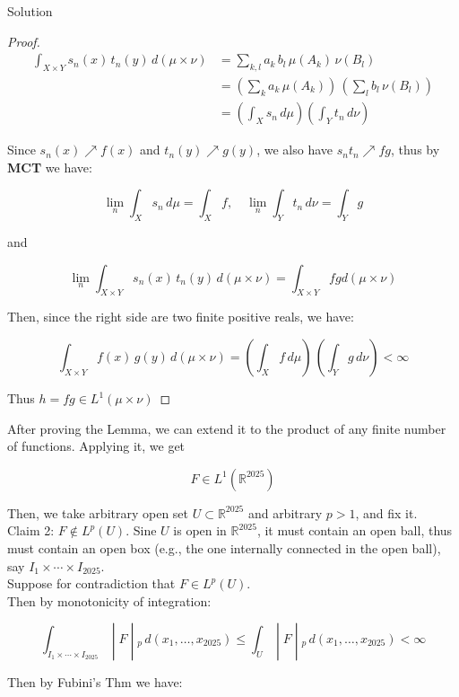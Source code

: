\documentclass{qlnotes-export}
\begin{document}
\begin{qlsolution}{Solution}
\begin{proof}
\[\begin{matrix}
{\int_{X \times Y}s_{n}(x)\, t_{n}(y)\, d(\mu \times \nu)} & {= \sum\limits_{k,l}a_{k}\, b_{l}\,\mu(A_{k})\,\nu(B_{l})} \\
 & {= (\sum\limits_{k}a_{k}\,\mu(A_{k}))\,(\sum\limits_{l}b_{l}\,\nu(B_{l}))} \\
 & {= (\int_{X}s_{n}\, d\mu)(\int_{Y}t_{n}\, d\nu)}
\end{matrix}\]

Since \(s_{n}(x)\operatorname{\nearrow ︎}f(x)\) and \(t_{n}(y)\operatorname{\nearrow ︎}g(y)\), we also have \(s_{n}t_{n}\operatorname{\nearrow ︎}fg\), thus by \textbf{MCT} we have:

\[\lim\limits_{n}\int_{X}s_{n}\, d\mu = \int_{X}f,\quad\lim\limits_{n}\int_{Y}t_{n}\, d\nu = \int_{Y}g\]

and

\[\lim\limits_{n}\int_{X \times Y}s_{n}(x)\, t_{n}(y)\, d(\mu \times \nu) = \int_{X \times Y}fg d(\mu \times \nu)\]

Then, since the right side are two finite positive reals, we have:

\[\int_{X \times Y}f(x)\, g(y)\, d(\mu \times \nu) = (\int_{X}f\, d\mu)\,(\int_{Y}g\, d\nu) < \infty\]

Thus \(h = fg \in L^{1}(\mu \times \nu)\)

\end{proof}

After proving the Lemma, we can extend it to the product of any finite number of functions. Applying it, we get

\[F \in L^{1}({\mathbb{R}}^{2025})\]

Then, we take arbitrary open set \(U \subset {\mathbb{R}}^{2025}\) and arbitrary \(p > 1\), and fix it.\\
Claim 2: \(F \notin L^{p}(U)\). Sine \(U\) is open in \({\mathbb{R}}^{2025}\), it must contain an open ball, thus must contain an open box (e.g., the one internally connected in the open ball), say \(I_{1} \times \cdots \times I_{2025}\).\\
Suppose for contradiction that \(F \in L^{p}(U)\).\\
Then by monotonicity of integration:

\[\left. \int_{I_{1} \times \cdots \times I_{2025}} \middle| F \middle| {}_{p}\, d(x_{1},\ldots,x_{2025}) \leq \int_{U} \middle| F \middle| {}_{p}\, d(x_{1},\ldots,x_{2025}) < \infty \right.\]

Then by Fubini's Thm we have:


\end{qlsolution}
\end{document}
